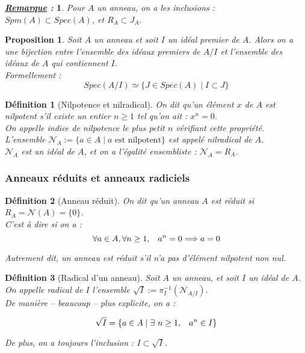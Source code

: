 \documentclass{article}           %
\newcommand\set[1]{\mathbb{#1}} 				%
\newcommand\cali[1]{\mathcal{#1}} 				%
\let\dummy\exists						%
\renewcommand*{\exists}{\dummy \,}
\newcommand\tq{\hspace{0.3cm}} 		%
\theoremstyle{break}
\theoremstyle{add}
\theoremstyle{break} %
\newtheorem{definition}{Définition}[section]
\newtheorem{proposition}{Proposition}[section]
\theoremstyle{add}
\newtheorem*{remarque}{\textit{\underline{Remarque} : }}
\begin{document}
\begin{remarque}
Pour $A$ un anneau, on a les inclusions : \\
$Spm(A) \subset Spec(A)$, et $R_A \subset J_A$. 
\end{remarque}

\begin{proposition}
Soit $A$ un anneau et soit $I$ un idéal premier de $A$. Alors on a une bijection entre l'ensemble des idéaux premiers de $A/I$ et l'ensemble des idéaux de $A$ qui contiennent $I$.\\
Formellement :
$$ Spec(A/I) \simeq \{J \in Spec(A) \;|\; I \subset J \}$$
\end{proposition}

\begin{definition}[Nilpotence et nilradical]
On dit qu'un élément $x$ de $A$ est \textit{nilpotent} s'il existe un entier $n \geq 1$ tel qu'on ait : $x^n = 0$. \\
On appelle \textit{indice de nilpotence} le plus petit $n$ vérifiant cette propriété. \\

L'ensemble $\cali{N}_A := \{a \in A \;|\; a \textrm{ est nilpotent} \}$ est appelé \textit{nilradical} de $A$. \\
$\cali{N}_A$ est un idéal de $A$, et on a l'égalité ensembliste : $\cali{N}_A = R_A$.
\end{definition}


\subsubsection{Anneaux réduits et anneaux radiciels}

\begin{definition}[Anneau réduit]
On dit qu'un anneau $A$ est réduit si $R_A = \cali{N}(A) = \{0\}$. \\
C'est à dire si on a :
$$ \forall a \in A, \forall n \geq 1, \tq a^n=0 \Longrightarrow a=0 $$ 

Autrement dit, un anneau est réduit s'il n'a pas d'élément nilpotent non nul.
\end{definition}

\begin{definition}[Radical d'un anneau]
Soit $A$ un anneau, et soit $I$ un idéal de $A$. \\
On appelle \textit{radical} de $I$ l'ensemble $\sqrt{I} := \pi_I^{-1}(\cali{N}_{A/I})$.  \\ De manière \--- beaucoup \--- plus explicite, on a :

$$ \sqrt{I} = \{ a \in A \;|\; \exists n \geq 1, \tq a^n \in I \} $$

De plus, on a toujours l'inclusion : $ I \subset \sqrt{I}$.
\end{definition}
\end{document}
